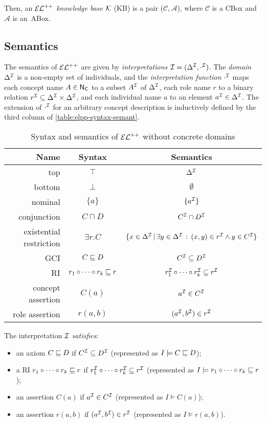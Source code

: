 Then, an $\mathcal{EL}^{++}$ \emph{knowledge base} $\mathcal{K}$ (KB) is a pair ($\mathcal{C}, \mathcal{A}$), where $\mathcal{C}$ is a CBox and $\mathcal{A}$ is an~ABox.

\subsection{Semantics}
The semantics of $\mathcal{EL}^{++}$ are given by \emph{interpretations} $\mathcal{I} = (\Delta^{\mathcal{I}}, \cdot^{\mathcal{I}})$. The \emph{domain} $\Delta^{\mathcal{I}}$ is a non-empty set of individuals, and the \emph{interpretation function} $\cdot^{\mathcal{I}}$ maps each concept name $A \in \mathsf{N_C}$ to a subset $A^{\mathcal{I}}$ of $\Delta^{\mathcal{I}}$, each role name $r$ to a binary relation $r^{\mathcal{I}} \subseteq \Delta^{\mathcal{I}} \times \Delta^{\mathcal{I}}$, and each individual name $a$ to an element $a^{\mathcal{I}} \in \Delta^{\mathcal{I}}$. The extension of $\cdot^{\mathcal{I}}$ for an arbitrary concept description is inductively defined by the third column of \autoref{table:elpp-syntax-semant}.

\begin{table}
  \centering
  \begin{tabular}{@{}rcc@{}}
    \toprule
    Name & Syntax & Semantics \\
    \midrule
    top     & $\top$  & $\Delta^{\mathcal{I}}$ \\
    bottom  & $\bot$  & $\emptyset$ \\
    nominal & $\{a\}$ & $\{a^{\mathcal{I}}\}$ \\
    conjunction & $C \sqcap D$ & $C^{\mathcal{I}} \cap D^{\mathcal{I}}$ \\
    existential restriction & $\exists r.C$ & $\{ x \in \Delta^{\mathcal{I}} \, | \, \exists y \in \Delta^{\mathcal{I}} \, : \, (x, y) \in r^{\mathcal{I}} \land y \in C^{\mathcal{I}} \}$ \\
    GCI & $C \sqsubseteq D$ & $C^{\mathcal{I}} \subseteq D^{\mathcal{I}}$ \\
    RI  & $r_1 \circ \cdots \circ r_k \sqsubseteq r$ & $r_1^{\mathcal{I}} \circ \cdots \circ r_k^{\mathcal{I}} \subseteq r^{\mathcal{I}}$ \\
    concept assertion & $C(a)$ & $a^{\mathcal{I}} \in C^{\mathcal{I}}$ \\
    role assertion & $r(a, b)$ & $(a^{\mathcal{I}}, b^{\mathcal{I}}) \in r^{\mathcal{I}}$\\ 
    \bottomrule
  \end{tabular}
  \caption{Syntax and semantics of $\mathcal{EL}^{++}$ without concrete domains}
  \label{table:elpp-syntax-semant}
\end{table}

The interpretation $\mathcal{I}$ \emph{satisfies}:
\begin{itemize}
  \item an axiom $C \sqsubseteq D$ if $C^{\mathcal{I}} \subseteq D^{\mathcal{I}}$ (represented as $I \models C \sqsubseteq D$);
  
  \item a RI $r_1 \circ \cdots \circ r_k \sqsubseteq r$ if $r_1^{\mathcal{I}} \circ \cdots \circ r_k^{\mathcal{I}} \subseteq r^{\mathcal{I}}$ (represented as $I \models r_1 \circ \cdots \circ r_k \sqsubseteq r$);
  
  \item an assertion $C(a)$ if $a^{\mathcal{I}} \in C^{\mathcal{I}}$ (represented as $I \models C(a)$);
  
  \item an assertion $r(a, b)$ if $(a^{\mathcal{I}}, b^{\mathcal{I}}) \in r^{\mathcal{I}}$ (represented as $I \models r(a, b)$). 
\end{itemize}

